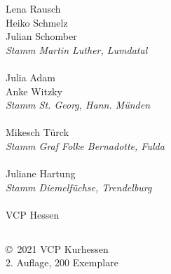 \begin{centering}
\begin{multicols}{2}
Lena Rausch \\ Heiko Schmelz \\ Julian Schomber \\
\textit{Stamm Martin Luther, Lumdatal} \\ ~\\

Julia Adam \\ Anke Witzky \\
\textit{Stamm St. Georg, Hann. Münden}  \\ ~\\

Mikesch Türck \\ \textit{Stamm Graf Folke Bernadotte, Fulda} \\ ~\\

Juliane Hartung \\ \textit{Stamm Diemelfüchse, Trendelburg} \\ ~\\

VCP Hessen

\end{multicols}

\subsection*{}
\vspace{6em} \copyright~2021 VCP Kurhessen \\
2. Auflage, 200 Exemplare

\end{centering}

